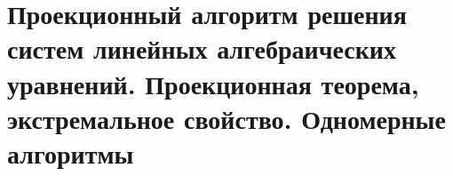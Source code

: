 \section{Проекционный алгоритм решения систем линейных алгебраических уравнений. Проекционная теорема, экстремальное свойство. Одномерные алгоритмы}
